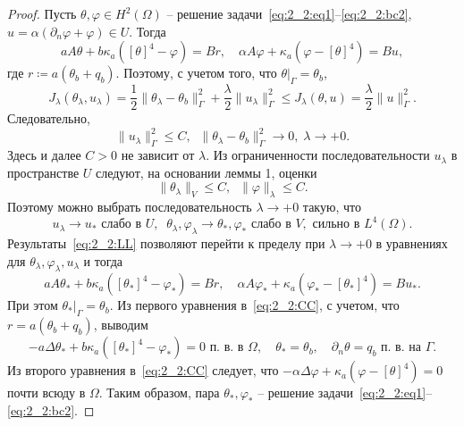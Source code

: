 \begin{proof}
    Пусть $\theta,\varphi\in H^2(\Omega)$ -- решение
    задачи~\eqref{eq:2_2:eq1}--\eqref{eq:2_2:bc2},
    $u=\alpha(\partial_n\varphi + \varphi)\in U$.
    Тогда
    \[
        a A \theta + b \kappa_a ([\theta]^4 - \varphi ) = Br,\quad
        \alpha A \varphi + \kappa_a (\varphi - [\theta]^4) = Bu,
    \]
    где $r \coloneqq a(\theta_b+q_b)$.
    Поэтому, с учетом того, что $\theta|_\Gamma=\theta_b$,
    \[
        J_\lambda(\theta_\lambda, u_\lambda)
        = \frac{1}{2}\|\theta_\lambda -\theta_b\|^2_\Gamma
        + \frac{\lambda}{2}\|u_\lambda\|^2_\Gamma
        \leq J_\lambda(\theta, u) = \frac{\lambda}{2}\|u\|^2_\Gamma.
    \]
    Следовательно,
    \[
        \|u_\lambda\|^2_\Gamma\leq C,\;\; \|\theta_\lambda
        -\theta_b\|^2_\Gamma\to 0,\; \lambda\to + 0.
    \]
    Здесь и далее $C>0$ не зависит от $\lambda.$
    Из ограниченности последовательности $u_\lambda$ в пространстве $U$ следуют, на основании
    леммы 1, оценки
    \[
        \|\theta_\lambda\|_V \leq C,\;\;
        \|\varphi\|_\lambda \leq C.
    \]
    Поэтому можно выбрать последовательность $\lambda\to+0$ такую, что
    \begin{equation}
        \label{eq:2_2:LL}
        u_\lambda \rightarrow u_* \text{  слабо в } U, \;\;
        \theta_\lambda, \varphi_\lambda \rightarrow \theta_*,\varphi_*
        \text{ слабо в } V, \text{ сильно в } L^4(\Omega).
    \end{equation}
    Результаты~\eqref{eq:2_2:LL} позволяют перейти к пределу при $\lambda\to+0$
    в уравнениях для $\theta_\lambda,\varphi_\lambda,u_\lambda$ и тогда
    \begin{equation}
        \label{eq:2_2:CC}
        a A \theta_* + b \kappa_a ([\theta_*]^4 - \varphi_* ) = Br,\quad
        \alpha A \varphi_* + \kappa_a (\varphi_* - [\theta_*]^4)  = Bu_*.
    \end{equation}
    При этом $\theta_*|_\Gamma=\theta_b$.
    Из первого уравнения в~\eqref{eq:2_2:CC}, с учетом, что $r = a(\theta_b + q_b)$,
    выводим
    \[
        - a\Delta\theta_* + b\kappa_a([\theta_*]^4- \varphi_*) = 0 \text{ п.\ в. в }\Omega,
        \quad \theta_*=\theta_b,\quad \partial_n\theta = q_b \text{ п.\ в. на }\Gamma.
    \]
    Из второго уравнения в~\eqref{eq:2_2:CC} следует, что
    $-\alpha \Delta \varphi + \kappa_a(\varphi-[\theta]^4) = 0$ почти всюду в $\Omega$.
    Таким образом, пара $\theta_*,\varphi_*$
    -- решение задачи~\eqref{eq:2_2:eq1}--\eqref{eq:2_2:bc2}.
\end{proof}

